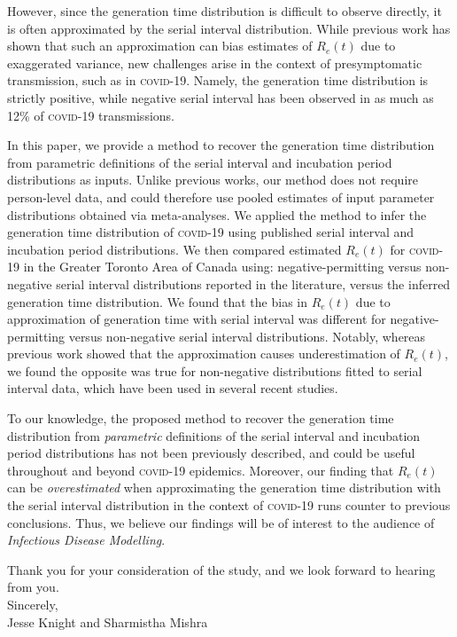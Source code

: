 \documentclass{article}
\newcommand{\covid}{\textsc{covid-19}\xspace}
\begin{document}
However, since the generation time distribution is difficult to observe directly,
it is often approximated by the serial interval distribution.
While previous work has shown that such an approximation
can bias estimates of $R_e(t)$ due to exaggerated variance,
new challenges arise in the context of presymptomatic transmission, such as in \covid.
Namely, the generation time distribution is strictly positive,
while negative serial interval has been observed in
as much as 12\% of \covid transmissions.
\par
In this paper, we provide a method to recover the generation time distribution from
parametric definitions of the serial interval and incubation period distributions as inputs.
Unlike previous works, our method does not require person-level data, and could therefore use
pooled estimates of input parameter distributions obtained via meta-analyses.
We applied the method to infer the generation time distribution of \covid
using published serial interval and incubation period distributions.
We then compared estimated $R_e(t)$ for \covid in the Greater Toronto Area of Canada using:
negative-permitting versus non-negative serial interval distributions reported in the literature,
versus the inferred generation time distribution.
We found that the bias in $R_e(t)$ due to approximation of generation time with serial interval
was different for negative-permitting versus non-negative serial interval distributions.
Notably, whereas previous work showed that the approximation causes underestimation of $R_e(t)$,
we found the opposite was true for non-negative distributions fitted to serial interval data,
which have been used in several recent studies.
\par
To our knowledge, the proposed method to recover the generation time distribution
from \emph{parametric} definitions of the serial interval and incubation period distributions
has not been previously described, and could be useful throughout and beyond \covid epidemics.
Moreover, our finding that $R_e(t)$ can be \emph{overestimated} when approximating
the generation time distribution with the serial interval distribution in the context of \covid
runs counter to previous conclusions.
Thus, we believe our findings will be of interest to the audience of \textit{Infectious Disease Modelling}.
\par
Thank you for your consideration of the study, and we look forward to hearing from you.
\\[2ex]
Sincerely,\\[1ex]
Jesse Knight and Sharmistha Mishra
\end{document}
